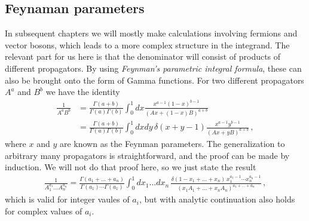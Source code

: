 \subsection*{Feynaman parameters}
In subsequent chapters we will mostly make calculations involving fermions and vector bosons, which leads to a more complex structure in the integrand. The relevant part for us here is that the denominator will consist of products of different propagators. By using \emph{Feynman's parametric integral formula}, these can also be brought onto the form of Gamma functions. For two different propagators $A^{a}$ and $B^{b}$ we have the identity
\begin{align}
    \frac{1}{A^{a}B^{b}}&=\frac{\Gamma(a+b)}{\Gamma(a)\Gamma(b)}\int_{0}^{1}dx\frac{x^{a-1}(1-x)^{b-1}}{(Ax+(1-x)B)^{a+b}}\nonumber
    \\
    &=\frac{\Gamma(a+b)}{\Gamma(a)\Gamma(b)}\int_{0}^{1}dxdy\,\delta(x+y-1)\frac{x^{a-1}y^{b-1}}{(Ax+yB)^{a+b}}\,,
\end{align}
where $x$ and $y$ are known as the Feynman parameters. The generalization to arbitrary many propagators is straightforward, and the proof can be made by induction. We will not do that proof here, so we just state the result
\begin{align}
    \frac{1}{A_{1}^{a_1}\dots A_{n}^{a_n}}=\frac{\Gamma(a_1+\dots +a_n)}{\Gamma(a_1)\cdots \Gamma(a_1)}\int_{0}^{1}dx_1\dots dx_n\,\frac{\delta(1-x_1+\dots +x_n)\,x_{1}^{a_1-1}\cdots x_{n}^{a_n-1}}{(x_{1}A_1+\dots+x_{n}A_{n})^{a_1+\dots +a_n}}\,,
\end{align}
which is valid for integer vaules of $a_i$, but with analytic continuation also holds for complex values of $a_i$. 

